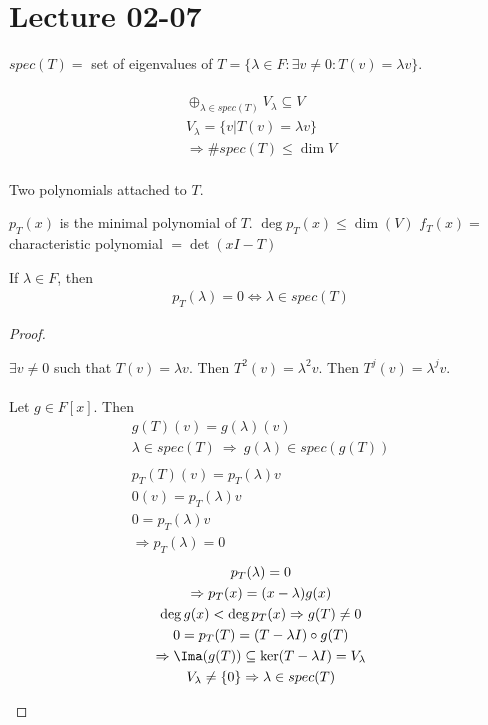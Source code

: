 \documentclass[class=scrartcl, crop=false]{standalone}
\date{2020-02-07}
\begin{document}
\section{Lecture 02-07}

$spec(T) =$ set of eigenvalues of $T = \{\lambda \in F : \exists v \neq 0 : T(v) = \lambda v\}$.
\\\\
\begin{gather*}
  \oplus_{\lambda \in spec(T)}V_\lambda \subseteq V \\
  V_\lambda = \{v | T(v) = \lambda v\} \\
  \Rightarrow \# spec(T) \leq \dim V \\
\end{gather*} 

Two polynomials attached to $T$. 
\begin{enumerate}
  \ii
  $p_T(x)$ is the minimal polynomial of $T$. $\deg p_T(x) \leq \dim(V)$
  \ii
  $f_T(x) =$ characteristic polynomial $= \det(xI - T)$
\end{enumerate} 

\begin{theorem}
  If $\lambda \in F$, then 
  \begin{gather*}
    p_T(\lambda) = 0 \Leftrightarrow \lambda \in spec(T)
  \end{gather*} 
  \begin{proof}
    \begin{itemize}
      \ii[]
      \ii[$(\Leftarrow)$ ]
      $\exists v \neq 0$ such that $T(v) = \lambda v$. Then $T^2(v) = \lambda^2v$. Then $T^j(v) =\lambda^jv$.
      \\\\
      Let $g \in F[x]$. Then
      \begin{gather*}
        g(T)(v) = g(\lambda)(v) \\
        \lambda \in spec(T) \ \Rightarrow \ g(\lambda) \in spec(g(T)) %
        \\\\
        p_T(T)(v) = p_T(\lambda)v \\
        0(v) = p_T(\lambda) v \\
        0 = p_T(\lambda)v \\
        \Rightarrow p_T(\lambda) = 0
      \end{gather*} 
      \ii[$(\Rightarrow)$ ]
      \begin{gather*}
        p_T(\lambda) = 0 \\
        \Rightarrow p_T(x) = (x - \lambda)g(x) \\
        \deg g(x) < \deg p_T(x) \Rightarrow g(T) \neq 0 \\
        0 = p_T(T) = (T - \lambda I)\circ g(T) \\
        \Rightarrow \Ima(g(T)) \subseteq \ker (T - \lambda I) = V_\lambda %
        \\
        V_\lambda \neq \{0\} \Rightarrow \lambda \in spec(T)
      \end{gather*} 
    \end{itemize} 
  \end{proof} 
\end{theorem} 
\end{document}

